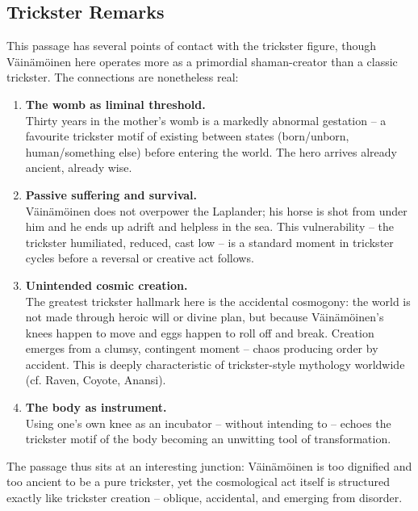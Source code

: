 \subsection{Trickster Remarks}

This passage has several points of contact with the trickster figure, though Väinämöinen here operates more as a primordial shaman-creator than a classic trickster. The connections are nonetheless real:

\begin{enumerate}
    \item \textbf{The womb as liminal threshold.} \\ Thirty years in the mother's womb is a markedly abnormal gestation -- a favourite trickster motif of existing between states (born/unborn, human/something else) before entering the world. The hero arrives already ancient, already wise.
    \item \textbf{Passive suffering and survival.} \\ Väinämöinen does not overpower the Laplander; his horse is shot from under him and he ends up adrift and helpless in the sea. This vulnerability -- the trickster humiliated, reduced, cast low -- is a standard moment in trickster cycles before a reversal or creative act follows.
    \item \textbf{Unintended cosmic creation.} \\ The greatest trickster hallmark here is the accidental cosmogony: the world is not made through heroic will or divine plan, but because Väinämöinen's knees happen to move and eggs happen to roll off and break. Creation emerges from a clumsy, contingent moment -- chaos producing order by accident. This is deeply characteristic of trickster-style mythology worldwide (cf. Raven, Coyote, Anansi).
    \item \textbf{The body as instrument.} \\ Using one's own knee as an incubator -- without intending to -- echoes the trickster motif of the body becoming an unwitting tool of transformation.
\end{enumerate}

The passage thus sits at an interesting junction: Väinämöinen is too dignified and too ancient to be a pure trickster, yet the cosmological act itself is structured exactly like trickster creation -- oblique, accidental, and emerging from disorder.
